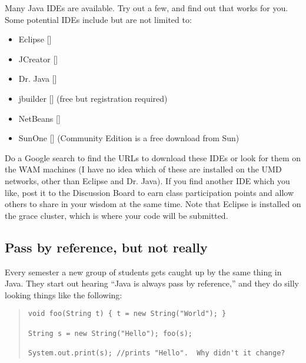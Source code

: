\documentclass[12pt]{article}
\begin{document}
Many Java IDEs are available.  Try out a few, and find out that works
for you.  Some potential IDEs include but are not limited to:

\begin{itemize}
\item Eclipse []
\item JCreator []
\item Dr. Java []
\item jbuilder [] (free but registration required)
\item NetBeans []
\item SunOne [] (Community Edition is a free download from Sun)
\end{itemize}

Do a Google search to find the URLs to download these IDEs or look for
them on the WAM machines (I have no idea which of these are installed
on the UMD networks, other than Eclipse and Dr. Java).  If you find
another IDE which you like, post it to the Discussion Board to earn
class participation points and allow others to share in your wisdom at
the same time. Note that Eclipse is installed on the grace cluster,
which is where your code will be submitted.



\subsection{Pass by reference, but not really}

Every semester a new group of students gets caught up by the same
thing in Java.  They start out hearing ``Java is always pass by
reference,'' and they do silly looking things like the following:
\begin{quote}
\begin{verbatim}
void foo(String t) { t = new String("World"); }

String s = new String("Hello"); foo(s);

System.out.print(s); //prints "Hello".  Why didn't it change?
\end{verbatim}
\end{quote}
\end{document}
